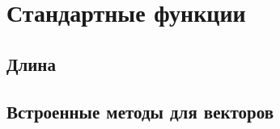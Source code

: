 \hypertarget{stdfuncs}{%
\section{Стандартные функции}\label{stdfuncs:chapter}}

\hypertarget{stdlen}{%
\subsection{Длина}\label{stdfuncs:stdlen}}


\hypertarget{stdvector}{%
\subsection{Встроенные методы для векторов}\label{stdfuncs:stdvector}}

